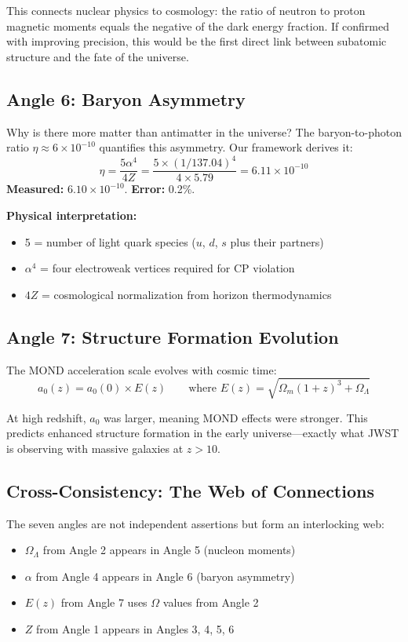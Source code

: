 \documentclass[11pt,a4paper]{article}
\theoremstyle{plain}
\theoremstyle{definition}
\theoremstyle{remark}
\newcommand{\Omegam}{\Omega_m}
\newcommand{\OmegaL}{\Omega_\Lambda}
\begin{document}
This connects nuclear physics to cosmology: the ratio of neutron to proton magnetic moments equals the negative of the dark energy fraction. If confirmed with improving precision, this would be the first direct link between subatomic structure and the fate of the universe.

\subsection{Angle 6: Baryon Asymmetry}

Why is there more matter than antimatter in the universe? The baryon-to-photon ratio $\eta \approx 6 \times 10^{-10}$ quantifies this asymmetry. Our framework derives it:
\[
\eta = \frac{5\alpha^4}{4Z} = \frac{5 \times (1/137.04)^4}{4 \times 5.79} = 6.11 \times 10^{-10}
\]
\textbf{Measured:} $6.10 \times 10^{-10}$. \textbf{Error:} 0.2\%.

\textbf{Physical interpretation:}
\begin{itemize}
  \item 5 = number of light quark species ($u$, $d$, $s$ plus their partners)
  \item $\alpha^4$ = four electroweak vertices required for CP violation
  \item $4Z$ = cosmological normalization from horizon thermodynamics
\end{itemize}

\subsection{Angle 7: Structure Formation Evolution}

The MOND acceleration scale evolves with cosmic time:
\[
a_0(z) = a_0(0) \times E(z) \qquad \text{where } E(z) = \sqrt{\Omegam(1+z)^3 + \OmegaL}
\]

At high redshift, $a_0$ was larger, meaning MOND effects were stronger. This predicts enhanced structure formation in the early universe---exactly what JWST is observing with massive galaxies at $z > 10$.

\subsection{Cross-Consistency: The Web of Connections}

The seven angles are not independent assertions but form an interlocking web:
\begin{itemize}
  \item $\OmegaL$ from Angle 2 appears in Angle 5 (nucleon moments)
  \item $\alpha$ from Angle 4 appears in Angle 6 (baryon asymmetry)
  \item $E(z)$ from Angle 7 uses $\Omega$ values from Angle 2
  \item $Z$ from Angle 1 appears in Angles 3, 4, 5, 6
\end{itemize}
\end{document}
